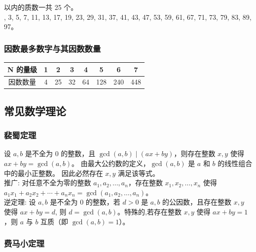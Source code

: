 \documentclass[a4paper,12pt]{article}
\begin{document}
 以内的质数一共 25 个。\\

, 3, 5, 7, 11, 13, 17, 19, 23, 29,  
31, 37, 41, 43, 47, 53, 59, 61, 67, 71,  
73, 79, 83, 89, 97。\\


\subsubsection{因数最多数字与其因数数量}

\begin{table}[htbp]
\centering
\begin{tabular}{c|ccccccc}
\toprule
N 的量级    & 1   & 2     & 3     & 4     & 5      & 6      & 7      \\
\midrule
因数数量 & 4   & 25 & 32 & 64 & 128 & 240 & 448 \\
\bottomrule
\end{tabular}
\end{table}

\subsection{常见数学理论}

\subsubsection{裴蜀定理}

\noindent 设 \( a, b \) 是不全为 0 的整数，且 \( \gcd(a, b) \mid (ax + by) \)，则存在整数 \( x, y \) 使得
\(ax + by = \gcd(a, b)\)。 
由最大公约数的定义，\( \gcd(a, b) \) 是 \( a \) 和 \( b \) 的线性组合中的最小正整数。
因此必然存在 \( x, y \) 满足该等式。\\

\noindent 推广: 对任意不全为零的整数 \( a_1, a_2, \ldots, a_n \)，存在整数 \( x_1, x_2, \ldots, x_n \) 使得
\(a_1x_1 + a_2x_2 + \cdots + a_nx_n = \gcd(a_1, a_2, \ldots, a_n)\)。 \\

\noindent 逆定理: 设 \( a, b \) 是不全为 0 的整数，若 \( d > 0 \) 是 \( a, b \) 的公因数，且存在整数 \( x, y \) 使得
\(ax + by = d\), 则 \( d = \gcd(a, b) \)。特殊的,若存在整数 \( x, y \) 使得 \( ax + by = 1 \)，则 \( a \) 与 \( b \) 互质（即 \( \gcd(a, b) = 1 \)）。

\subsubsection{费马小定理}
\end{document}
